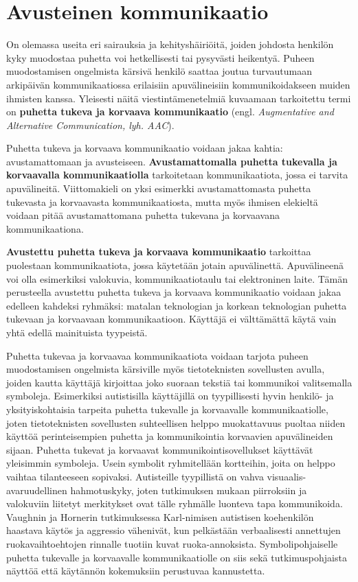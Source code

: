 \documentclass[utf8]{gradu3}
\begin{document}
\section{Avusteinen kommunikaatio}

On olemassa useita eri sairauksia ja kehityshäiriöitä, joiden johdosta henkilön kyky muodostaa puhetta voi hetkellisesti tai pysyvästi heikentyä. Puheen muodostamisen ongelmista kärsivä henkilö saattaa joutua turvautumaan arkipäivän kommunikaatiossa erilaisiin apuvälineisiin kommunikoidakseen muiden ihmisten kanssa. Yleisesti näitä viestintämenetelmiä kuvaamaan tarkoitettu termi on \textbf{puhetta tukeva ja korvaava kommunikaatio} (engl. \textit{Augmentative and Alternative Communication, lyh. AAC}).

Puhetta tukeva ja korvaava kommunikaatio voidaan jakaa kahtia: avustamattomaan ja avusteiseen. \textbf{Avustamattomalla puhetta tukevalla ja korvaavalla kommunikaatiolla} tarkoitetaan kommunikaatiota, jossa ei tarvita apuvälineitä. Viittomakieli on yksi esimerkki avustamattomasta puhetta tukevasta ja korvaavasta kommunikaatiosta, mutta myös ihmisen elekieltä voidaan pitää avustamattomana puhetta tukevana ja korvaavana kommunikaationa. 

\textbf{Avustettu puhetta tukeva ja korvaava kommunikaatio} tarkoittaa puolestaan kommunikaatiota, jossa käytetään jotain apuvälinettä. Apuvälineenä voi olla esimerkiksi valokuvia, kommunikaatiotaulu tai elektroninen laite. Tämän perusteella avustettu puhetta tukeva ja korvaava kommunikaatio voidaan jakaa edelleen kahdeksi ryhmäksi: matalan teknologian ja korkean teknologian puhetta tukevaan ja korvaavaan kommunikaatioon. Käyttäjä ei välttämättä käytä vain yhtä edellä mainituista tyypeistä. \parencite[]{AAC-conditional-use}

Puhetta tukevaa ja korvaavaa kommunikaatiota voidaan tarjota puheen muodostamisen ongelmista kärsiville myös tietoteknisten sovellusten avulla, joiden kautta käyttäjä kirjoittaa joko suoraan tekstiä tai kommunikoi valitsemalla symboleja. Esimerkiksi autistisilla käyttäjillä on tyypillisesti hyvin henkilö- ja yksityiskohtaisia tarpeita puhetta tukevalle ja korvaavalle kommunikaatiolle, joten tietoteknisten sovellusten suhteellisen helppo muokattavuus puoltaa niiden käyttöä perinteisempien puhetta ja kommunikointia korvaavien apuvälineiden sijaan.
\label{AAC-symbols}
Puhetta tukevat ja korvaavat kommunikointisovellukset käyttävät yleisimmin symboleja. Usein symbolit ryhmitellään kortteihin, joita on helppo vaihtaa tilanteeseen sopivaksi\label{AAC-cards}. Autisteille tyypillistä on vahva visuaalis-avaruudellinen hahmotuskyky, joten tutkimuksen mukaan piirroksiin ja valokuviin liitetyt merkitykset ovat tälle ryhmälle luonteva tapa kommunikoida. Vaughnin ja Hornerin tutkimuksessa \parencite[]{concrete-versus-verbal} Karl-nimisen autistisen koehenkilön haastava käytös ja aggressio vähenivät, kun pelkästään verbaalisesti annettujen ruokavaihtoehtojen rinnalle tuotiin kuvat ruoka-annoksista. Symbolipohjaiselle puhetta tukevalle ja korvaavalle kommunikaatiolle on siis sekä tutkimuspohjaista näyttöä että käytännön kokemuksiin perustuvaa kannustetta.
\end{document}
